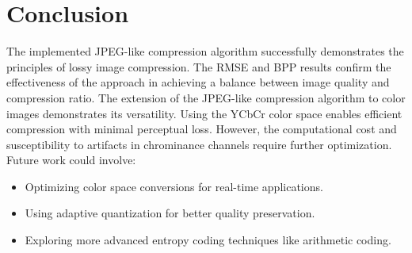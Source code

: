 \documentclass{article}
\begin{document}
\section{Conclusion}
The implemented JPEG-like compression algorithm successfully demonstrates the principles of lossy image compression. The RMSE and BPP results confirm the effectiveness of the approach in achieving a balance between image quality and compression ratio. The extension of the JPEG-like compression algorithm to color images demonstrates its versatility. Using the YCbCr color space enables efficient compression with minimal perceptual loss. However, the computational cost and susceptibility to artifacts in chrominance channels require further optimization. Future work could involve:
\begin{itemize}
    \item Optimizing color space conversions for real-time applications.
    \item Using adaptive quantization for better quality preservation.
    \item Exploring more advanced entropy coding techniques like arithmetic coding.
\end{itemize}
\end{document}
